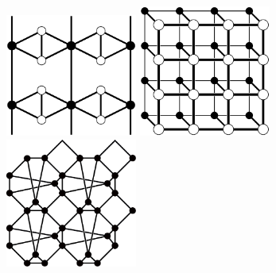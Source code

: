 \documentclass{beamer}
\begin{document}
\begin{frame}
  \begin{center}
    \includegraphics[width=1.7in]{unstable}
    \qquad
    \includegraphics[width=1.7in]{ladder}\\
    \includegraphics[width=1.7in]{collision}
  \end{center}
\end{frame}
\end{document}
